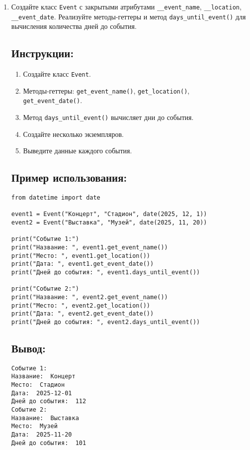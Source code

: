 \begin{enumerate}
\item
Создайте класс \texttt{Event} с закрытыми атрибутами \texttt{\_\_event\_name}, \texttt{\_\_location}, \texttt{\_\_event\_date}. Реализуйте методы-геттеры и метод \texttt{days\_until\_event()} для вычисления количества дней до события.

\subsection*{Инструкции:}
\begin{enumerate}
    \item Создайте класс \texttt{Event}.
    \item Методы-геттеры: \texttt{get\_event\_name()}, \texttt{get\_location()}, \texttt{get\_event\_date()}.
    \item Метод \texttt{days\_until\_event()} вычисляет дни до события.
    \item Создайте несколько экземпляров.
    \item Выведите данные каждого события.
\end{enumerate}

\subsection*{Пример использования:}
\begin{lstlisting}[caption=Пример кода]
from datetime import date

event1 = Event("Концерт", "Стадион", date(2025, 12, 1))
event2 = Event("Выставка", "Музей", date(2025, 11, 20))

print("Событие 1:")
print("Название: ", event1.get_event_name())
print("Место: ", event1.get_location())
print("Дата: ", event1.get_event_date())
print("Дней до события: ", event1.days_until_event())

print("Событие 2:")
print("Название: ", event2.get_event_name())
print("Место: ", event2.get_location())
print("Дата: ", event2.get_event_date())
print("Дней до события: ", event2.days_until_event())
\end{lstlisting}

\subsection*{Вывод:}
\begin{lstlisting}[caption=Ожидаемый вывод]
Событие 1:
Название:  Концерт
Место:  Стадион
Дата:  2025-12-01
Дней до события:  112
Событие 2:
Название:  Выставка
Место:  Музей
Дата:  2025-11-20
Дней до события:  101
\end{lstlisting}


\end{enumerate}
